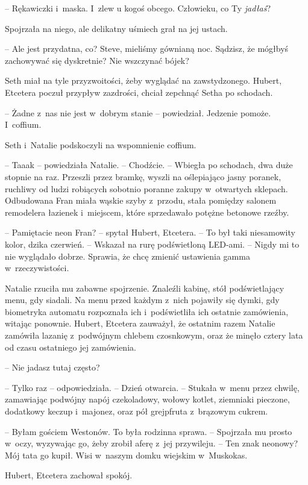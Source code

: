 \documentclass[oneside,polish,11pt,sfheadings]{mwbk}
\begin{document}
-- Rękawiczki i~maska. I~zlew u kogoś obcego.
Człowieku, co Ty \textit{jadłaś}?

Spojrzała na niego, ale delikatny uśmiech grał na jej ustach. 

-- Ale jest
przydatna, co? Steve, mieliśmy gównianą noc. Sądzisz, że mógłbyś
zachowywać się dyskretnie? Nie wszczynać bójek?

Seth miał na tyle przyzwoitości, żeby wyglądać na zawstydzonego. Hubert,
Etcetera poczuł przypływ zazdrości, chciał zepchnąć Setha po schodach. 

-- Żadne z~nas nie jest w~dobrym stanie -- powiedział. Jedzenie pomoże. I~coffium.

Seth i~Natalie podskoczyli na wspomnienie coffium. 

-- Taaak -- powiedziała
Natalie. -- Chodźcie. -- Wbiegła po schodach, dwa duże stopnie na raz.
Przeszli przez bramkę, wyszli na oślepiająco jasny poranek, ruchliwy od
ludzi robiących sobotnio \dywiz poranne zakupy w~otwartych sklepach. Odbudowana
Fran miała wąskie szyby z~przodu, stała pomiędzy salonem remodelera
łazienek i~miejscem, które sprzedawało potężne betonowe rzeźby.

-- Pamiętacie neon Fran? -- spytał Hubert, Etcetera. -- To był taki
niesamowity kolor, dzika czerwień. -- Wskazał na rurę podświetloną
LED-ami. -- Nigdy mi to nie wyglądało dobrze. Sprawia, że chcę zmienić
ustawienia gamma w~rzeczywistości.

Natalie rzuciła mu zabawne spojrzenie. Znaleźli kabinę, stół
podświetlający menu, gdy siadali. Na menu przed każdym z~nich pojawiły
się dymki, gdy biometryka automatu rozpoznała ich i~podświetliła ich
ostatnie zamówienia, witając ponownie. Hubert, Etcetera zauważył, że
ostatnim razem Natalie zamówiła lazanię z~podwójnym chlebem czosnkowym,
oraz że minęło cztery lata od czasu ostatniego jej zamówienia. 

-- Nie
jadasz tutaj często?

-- Tylko raz -- odpowiedziała. -- Dzień otwarcia. -- Stukała w~menu przez
chwilę, zamawiając podwójny napój czekoladowy, wołowy kotlet, ziemniaki
pieczone, dodatkowy keczup i~majonez, oraz pół grejpfruta z~brązowym
cukrem. 

-- Byłam gościem Westonów. To była rodzinna sprawa. -- Spojrzała
mu prosto w~oczy, wyzywając go, żeby zrobił aferę z~jej przywileju. -- Ten znak neonowy? Mój tata go kupił. Wisi w~naszym domku wiejskim w~Muskokas.

Hubert, Etcetera zachował spokój. 
\end{document}

